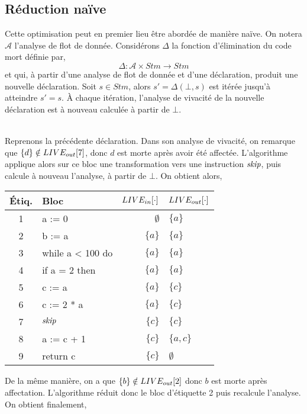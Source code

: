 \documentclass[a4paper, 10pt]{article}
\begin{document}
\subsection{Réduction naïve}
Cette optimisation peut en premier lieu être abordée de manière naïve. On notera $\mathcal{A}$ l'analyse de flot de donnée.
Considérons $\Delta$ la fonction d'élimination du code mort définie par,
\[\Delta : \mathcal{A} \times Stm \longrightarrow Stm\]
et qui, à partir d'une analyse de flot de donnée et d'une déclaration, produit une nouvelle déclaration. Soit $s \in Stm$, alors
$s' = \Delta(\bot, s)$ est itérée jusqu'à atteindre $s' = s$. À chaque itération,
l'analyse de vivacité de la nouvelle déclaration est à nouveau calculée à partir de $\bot$.
 \\
 \\
\begin{example}
Reprenons la précédente déclaration. Dans son analyse de vivacité, on remarque que
$\{d\} \notin LIVE_{out}[7]$, donc $d$ est morte après avoir été affectée. L'algorithme
applique alors sur ce bloc une transformation vers une instruction $\textit{skip}$, puis calcule
à nouveau l'analyse, à partir de $\bot$. On obtient alors,
\\
\begin{center}
	\begin{tabular}{||c|l|r|l||}
	\hline
	Étiq. & Bloc & $LIVE_{in}[\cdot]$ & $LIVE_{out}[\cdot]$ \\
	\hline
	1 & a := 0 & $\emptyset$ & $\{a\}$\\
	2 & b := a & $\{a\}$ & $\{a\}$\\
	3 & while a < 100 do & $\{a\}$ & $\{a\}$\\
	4 & if a = 2 then & $\{a\}$ & $\{a\}$\\
	5 & c := a & $\{a\}$ & $\{c\}$\\
	6 & c := 2 * a & $\{a\}$ & $\{c\}$\\
	7 & $\textit{skip}$ & $\{c\}$ & $\{c\}$\\
	8 & a := c + 1 & $\{c\}$ & $\{a, c\}$\\
	9 & return c & $\{c\}$ & $\emptyset$\\
	\hline
	\end{tabular}
\end{center}
De la même manière, on a que $\{b\} \notin LIVE_{out}[2]$ donc $b$ est morte après
affectation. L'algorithme réduit donc le bloc d'étiquette 2 puis recalcule l'analyse.
On obtient finalement,
\\
\begin{center}
	\begin{tabular}{||c|l|r|l||}

\end{tabular}
\end{center}
\end{example}
\end{document}
